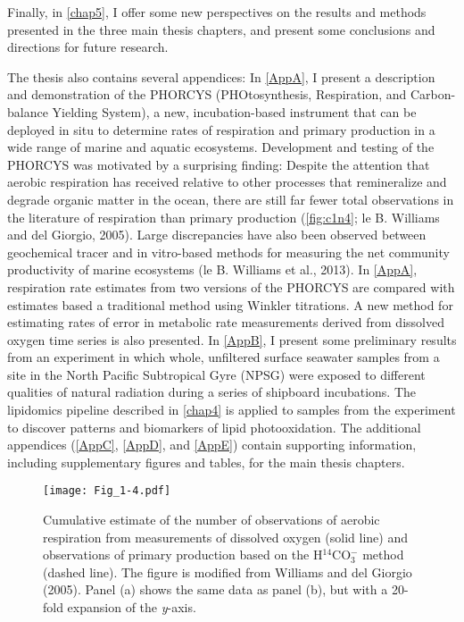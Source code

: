 Finally, in \autoref{chap5}, I offer some new perspectives on the results and methods presented in the three main thesis chapters, and present some conclusions and directions for future research.

The thesis also contains several appendices: In \autoref{AppA}, I present a description and demonstration of the PHORCYS (PHOtosynthesis, Respiration, and Carbon-balance Yielding System), a new, incubation-based instrument that can be deployed in situ to determine rates of respiration and primary production in a wide range of marine and aquatic ecosystems. Development and testing of the PHORCYS was motivated by a surprising finding: Despite the attention that aerobic respiration has received relative to other processes that remineralize and degrade organic matter in the ocean, there are still far fewer total observations in the literature of respiration than primary production (\autoref{fig:c1n4}; le B. Williams and del Giorgio, 2005). Large discrepancies have also been observed between geochemical tracer and in vitro-based methods for measuring the net community productivity of marine ecosystems (le B. Williams et al., 2013). In \autoref{AppA}, respiration rate estimates from two versions of the PHORCYS are compared with estimates based a traditional method using Winkler titrations. A new method for estimating rates of error in metabolic rate measurements derived from dissolved oxygen time series is also presented. In \autoref{AppB}, I present some preliminary results from an experiment in which whole, unfiltered surface seawater samples from a site in the North Pacific Subtropical Gyre (NPSG) were exposed to different qualities of natural radiation during a series of shipboard incubations. The lipidomics pipeline described in \autoref{chap4} is applied to samples from the experiment to discover patterns and biomarkers of lipid photooxidation. The additional appendices (\autoref{AppC}, \autoref{AppD}, and \autoref{AppE}) contain supporting information, including supplementary figures and tables, for the main thesis chapters.

\begin{figure}[!th]
\centering
\texttt{[image: Fig\_1-4.pdf]}
\caption[Cumulative estimate of the number of observations of aerobic respiration from measurements of dissolved oxygen and observations of primary production based on the H$^{14}$CO$_3^-$ method.]{Cumulative estimate of the number of observations of aerobic respiration from measurements of dissolved oxygen (solid line) and observations of primary production based on the H$^{14}$CO$_3^-$ method (dashed line). The figure is modified from Williams and del Giorgio (2005). Panel (a) shows the same data as panel (b), but with a 20-fold expansion of the \emph{y}-axis.}
\label{fig:c1n4}
\end{figure}

